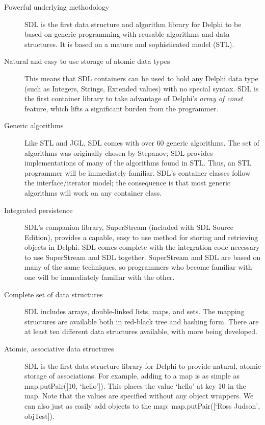 \documentclass{report}
\begin{document}
\begin{description}
\item[Powerful underlying methodology] SDL is the first data structure and
algorithm library for Delphi to be based on generic programming with
reusable algorithms and data structures. It is based on a mature and
sophisticated model (STL).

\item[Natural and easy to use storage of atomic data types]
This means that SDL containers can be used to hold any Delphi data type
(such as Integers, Strings, Extended values) with no special syntax. SDL is
the first container library to take advantage of Delphi's
\emph{array of const} feature, which lifts a significant burden from the
programmer.

\item[Generic algorithms] Like STL and JGL, SDL comes with over 60 generic
algorithms. The set of algorithms was originally chosen by Stepanov; SDL
provides implementations of many of the algorithms found in STL.  Thus, an
STL programmer will be immediately familiar. SDL's container classes follow
the interface/iterator model; the consequence is that most generic
algorithms will work on any container class.

\item[Integrated persistence]
SDL's companion library, SuperStream (included with SDL Source Edition),
provides a capable, easy to use method for storing and retrieving objects in
Delphi. SDL comes complete with the integration code necessary to use
SuperStream and SDL together. SuperStream and SDL are based on many of the
same techniques, so programmers who become familiar with one will be
immediately familiar with the other.

\item[Complete set of data structures]
SDL includes arrays, double-linked lists,
maps, and sets. The mapping structures are available 
both in red-black tree
and hashing form. There are at least ten different data structures 
available,
with more being developed.

\item[Atomic, associative data structures] SDL is the first data structure
library for Delphi to provide natural, atomic storage of associations.  For
example, adding to a map is as simple as map.putPair([10, `hello']). This
places the value `hello' at key 10 in the map. Note that the values are
specified without any object wrappers. We can also just as easily add
objects to the map: map.putPair([`Ross Judson', objTest]).
\end{description}
\end{document}
